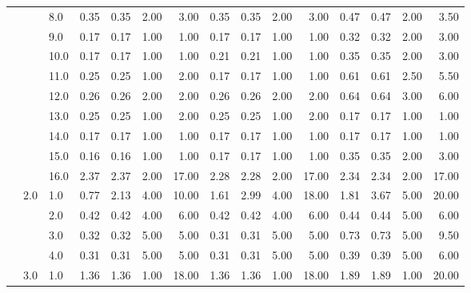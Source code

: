 \begin{tabular}{lllrrrrrrrrrrrr}
       &     & 8.0  &       0.35 &      0.35 & 2.00 &   3.00 &       0.35 &      0.35 &  2.00 &   3.00 &       0.47 &      0.47 &  2.00 &   3.50 \\
       &     & 9.0  &       0.17 &      0.17 & 1.00 &   1.00 &       0.17 &      0.17 &  1.00 &   1.00 &       0.32 &      0.32 &  2.00 &   3.00 \\
       &     & 10.0 &       0.17 &      0.17 & 1.00 &   1.00 &       0.21 &      0.21 &  1.00 &   1.00 &       0.35 &      0.35 &  2.00 &   3.00 \\
       &     & 11.0 &       0.25 &      0.25 & 1.00 &   2.00 &       0.17 &      0.17 &  1.00 &   1.00 &       0.61 &      0.61 &  2.50 &   5.50 \\
       &     & 12.0 &       0.26 &      0.26 & 2.00 &   2.00 &       0.26 &      0.26 &  2.00 &   2.00 &       0.64 &      0.64 &  3.00 &   6.00 \\
       &     & 13.0 &       0.25 &      0.25 & 1.00 &   2.00 &       0.25 &      0.25 &  1.00 &   2.00 &       0.17 &      0.17 &  1.00 &   1.00 \\
       &     & 14.0 &       0.17 &      0.17 & 1.00 &   1.00 &       0.17 &      0.17 &  1.00 &   1.00 &       0.17 &      0.17 &  1.00 &   1.00 \\
       &     & 15.0 &       0.16 &      0.16 & 1.00 &   1.00 &       0.17 &      0.17 &  1.00 &   1.00 &       0.35 &      0.35 &  2.00 &   3.00 \\
       &     & 16.0 &       2.37 &      2.37 & 2.00 &  17.00 &       2.28 &      2.28 &  2.00 &  17.00 &       2.34 &      2.34 &  2.00 &  17.00 \\
       & 2.0 & 1.0  &       0.77 &      2.13 & 4.00 &  10.00 &       1.61 &      2.99 &  4.00 &  18.00 &       1.81 &      3.67 &  5.00 &  20.00 \\
       &     & 2.0  &       0.42 &      0.42 & 4.00 &   6.00 &       0.42 &      0.42 &  4.00 &   6.00 &       0.44 &      0.44 &  5.00 &   6.00 \\
       &     & 3.0  &       0.32 &      0.32 & 5.00 &   5.00 &       0.31 &      0.31 &  5.00 &   5.00 &       0.73 &      0.73 &  5.00 &   9.50 \\
       &     & 4.0  &       0.31 &      0.31 & 5.00 &   5.00 &       0.31 &      0.31 &  5.00 &   5.00 &       0.39 &      0.39 &  5.00 &   6.00 \\
       & 3.0 & 1.0  &       1.36 &      1.36 & 1.00 &  18.00 &       1.36 &      1.36 &  1.00 &  18.00 &       1.89 &      1.89 &  1.00 &  20.00 \\

\end{tabular}
